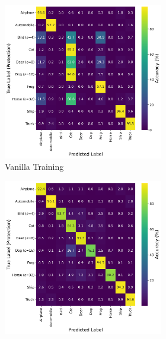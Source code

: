 \documentclass[conference]{IEEEtran}
\theoremstyle{definition}
\theoremstyle{remark}
\theoremstyle{proposition}
\begin{document}
\begin{figure}[tb!]
    \begin{subfigure}{1.0\textwidth}
    \centering
        \begin{subfigure}{.40\textwidth}
    		\centering
    		\includegraphics[width=1.0\textwidth]{combination_attacks/ResNet18_UNL_eps_combo_t_0_confusion_matrix.png}
            \caption*{Vanilla Training}
    	\end{subfigure}
     \hspace{5em}
        \begin{subfigure}{.40\textwidth}
    		\centering
    		\includegraphics[width=1.0\textwidth]{combination_attacks/ResNet18_UNL_eps_combo_t_200_confusion_matrix.png}

\end{subfigure}
\end{subfigure}
\end{figure}
\end{document}
